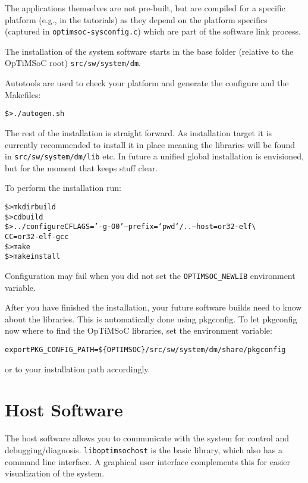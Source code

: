 The applications themselves are not pre-built, but are compiled for a
specific platform (e.g., in the tutorials) as they depend on the
platform specifics (captured in \verb|optimsoc-sysconfig.c|) which are
part of the software link process.

The installation of the system software starts in the base folder
(relative to the OpTiMSoC root) \verb|src/sw/system/dm|.

Autotools are used to check your platform and generate the configure
and the Makefiles:

\begin{alltt}
\$> ./autogen.sh
\end{alltt}

The rest of the installation is straight forward. As installation
target it is currently recommended to install it in place meaning the
libraries will be found in \verb|src/sw/system/dm/lib| etc. In future
a unified global installation is envisioned, but for the moment that
keeps stuff clear.

To perform the installation run:

\begin{alltt}
\$> mkdir build
\$> cd build
\$> ../configure CFLAGS='-g -O0' --prefix=`pwd`/.. --host=or32-elf \textbackslash
    CC=or32-elf-gcc
\$> make
\$> make install
\end{alltt}

Configuration may fail when you did not set the \verb|OPTIMSOC_NEWLIB|
environment variable.

After you have finished the installation, your future software builds
need to know about the libraries. This is automatically done using
pkgconfig. To let pkgconfig now where to find the OpTiMSoC libraries,
set the environment variable:

\begin{alltt}
export PKG_CONFIG_PATH=\$\{OPTIMSOC\}/src/sw/system/dm/share/pkgconfig
\end{alltt}

or to your installation path accordingly.

\section{Host Software}

The host software allows you to communicate with the system for
control and debugging/diagnosis. \verb|liboptimsochost| is the basic
library, which also has a command line interface. A graphical user
interface complements this for easier visualization of the system.

